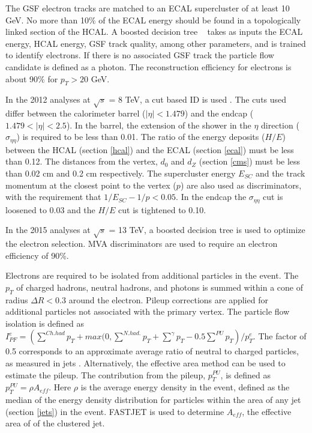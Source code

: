 \documentclass[oneside, letterpaper, oldfontcommands]{memoir}
\begin{document}
\qquad The GSF electron tracks are matched to an ECAL supercluster of at least 10 GeV. No more than 10$\%$ of the ECAL energy should be found in a topologically linked section of the HCAL. A boosted decision tree ~\cite{Hocker:2007ht} takes as inputs the ECAL energy, HCAL energy, GSF track quality, among other parameters, and is trained to identify electrons. If there is no associated GSF track the particle flow candidate is defined as a photon. The reconstruction efficiency for electrons is about 90$\%$ for $p_{T} > 20$ GeV. ~\cite{Khachatryan:2015hwa}

\qquad In the 2012 analyses at $\sqrt{s}$ = 8 TeV, a cut based ID is used \cite{Khachatryan:2015hwa}. The cuts used differ between the calorimeter barrel ($|\eta| < 1.479$) and the endcap ($1.479 < |\eta| < 2.5$). In the barrel, the extension of the shower in the $\eta$ direction ($\sigma_{\eta\eta}$) is required to be less than 0.01. The ratio of the energy deposits ($H/E$) between the HCAL (section \ref{hcal}) and the ECAL (section \ref{ecal}) must be less than 0.12.    The distances from the vertex, $d_{0}$ and $d_{Z}$ (section \ref{cms}) must be less than 0.02 cm and 0.2 cm respectively. The supercluster energy $E_{SC}$ and the track momentum at the closest point to the vertex ($p$) are also used as discriminators, with the requirement that $1/E_{SC} - 1/p < 0.05$. In the endcap the $\sigma_{\eta\eta}$ cut is loosened to 0.03 and the $H/E$ cut is tightened to 0.10.

\qquad In the 2015 analyses at $\sqrt{s}$ = 13 TeV, a boosted decision tree is used to optimize the electron selection. MVA discriminators are used to require an electron efficiency of 90\%.

\qquad Electrons are required to be isolated from additional particles in the event. The $p_{T}$ of charged hadrons, neutral hadrons, and photons is summed within a cone of radius $\Delta R < 0.3$ around the electron.  Pileup corrections are applied for additional particles not associated with the primary vertex. The particle flow isolation is defined as $I_{PF}^{e} = \left(\sum\limits^{Ch. had} p_{T} + max(0, \sum\limits^{N. had.} p_{T} + \sum\limits^{\gamma} p_{T} - 0.5 \sum\limits^{PU} p_{T}\right)/p_{T}^{e}$. The factor of 0.5 corresponds to an approximate average ratio of neutral to charged particles, as measured in jets \cite{CMS-PAS-PFT-10-002}. Alternatively, the effective area method can be used to estimate the pileup. The contribution from the pileup, $p_{T}^{PU}$, is defined as $p_{T}^{PU} = \rho A_{eff}$. Here $\rho$ is the average energy density in the event, defined as the median of the energy density distribution for particles within the area of any jet (section \ref{jets}) in the event.\cite{Khachatryan:2015hwa} FASTJET \cite{Cacciari:2011ma} is used to determine $A_{eff}$, the effective area of of the clustered jet.  
\end{document}
